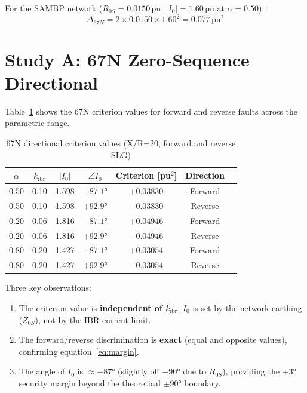 \documentclass[11pt,a4paper]{article}
\begin{document}
For the SAMBP network ($R_{0S}=0.0150$\,pu, $|I_0|=1.60$\,pu at $\alpha=0.50$):
\begin{equation}
  \Delta_{67N} = 2 \times 0.0150 \times 1.60^2 = 0.077\,\mathrm{pu}^2
\end{equation}

\section{Study A: 67N Zero-Sequence Directional}
\label{sec:67n}

Table~\ref{tab:67n} shows the 67N criterion values for forward and reverse faults
across the parametric range.

\begin{table}[h]
\centering
\caption{67N directional criterion values (X/R=20, forward and reverse SLG)}
\label{tab:67n}
\begin{tabular}{@{}ccccccl@{}}
\toprule
$\alpha$ & $k_\mathrm{ibr}$ & $|I_0|$ & $\angle I_0$ & Criterion [pu$^2$] & Direction \\
\midrule
0.50 & 0.10 & 1.598 & $-87.1°$ & $+0.03830$ & Forward \\
0.50 & 0.10 & 1.598 & $+92.9°$ & $-0.03830$ & Reverse \\
0.20 & 0.06 & 1.816 & $-87.1°$ & $+0.04946$ & Forward \\
0.20 & 0.06 & 1.816 & $+92.9°$ & $-0.04946$ & Reverse \\
0.80 & 0.20 & 1.427 & $-87.1°$ & $+0.03054$ & Forward \\
0.80 & 0.20 & 1.427 & $+92.9°$ & $-0.03054$ & Reverse \\
\bottomrule
\end{tabular}
\end{table}

Three key observations:
\begin{enumerate}
  \item The criterion value is \textbf{independent of $k_\mathrm{ibr}$}: $I_0$ is
        set by the network earthing ($Z_{0S}$), not by the IBR current limit.
  \item The forward/reverse discrimination is \textbf{exact} (equal and opposite
        values), confirming equation~\eqref{eq:margin}.
  \item The angle of $I_0$ is $\approx -87°$ (slightly off $-90°$ due to $R_{0S}$),
        providing the $+3°$ security margin beyond the theoretical $±90°$ boundary.
\end{enumerate}
\end{document}
